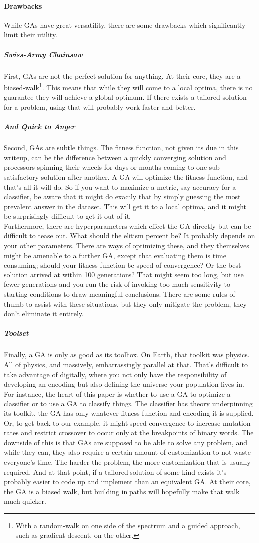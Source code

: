 \paragraph{Drawbacks}
While GAs have great versatility, there are some drawbacks which significantly limit their utility.
\subparagraph{Swiss-Army Chainsaw}
First, GAs are not the perfect solution for anything.  At their core, they are a biased-walk\footnote{With a random-walk on one side of the spectrum and a guided approach, such as gradient descent, on the other.}.  This means that while they will come to a local optima, there is no guarantee they will achieve a global optimum.  If there exists a tailored solution for a problem, using that will probably work faster and better.
\subparagraph{And Quick to Anger}
Second, GAs are subtle things.  The fitness function, not given its due in this writeup, can be the difference between a quickly converging solution and processors spinning their wheels for days or months coming to one sub-satisfactory solution after another.  A GA will optimize the fitness function, and that's all it will do.  So if you want to maximize a metric, say accuracy for a classifier, be aware that it might do exactly that by simply guessing the most prevalent answer in the dataset.  This will get it to a local optima, and it might be surprisingly difficult to get it out of it.\\
Furthermore, there are hyperparameters which effect the GA directly but can be difficult to tease out.  What should the elitism percent be?  It probably depends on your other parameters.  There are ways of optimizing these, and they themselves might be amenable to a further GA, except that evaluating them is time consuming; should your fitness function be speed of convergence?  Or the best solution arrived at within 100 generations?  That might seem too long, but use fewer generations and you run the risk of invoking too much sensitivity to starting conditions to draw meaningful conclusions.  There are some rules of thumb to assist with these situations, but they only mitigate the problem, they don't eliminate it entirely.
\subparagraph{Toolset}
Finally, a GA is only as good as its toolbox.  On Earth, that toolkit was physics.  All of physics, and massively, embarrassingly parallel at that.  That's difficult to take advantage of digitally, where you not only have the responsibility of developing an encoding but also defining the universe your population lives in.  For instance, the heart of this paper is whether to use a GA to optimize a classifier or to use a GA to classify things.  The classifier has theory underpinning its toolkit, the GA has only whatever fitness function and encoding it is supplied.  Or, to get back to our example, it might speed convergence to increase mutation rates and restrict crossover to occur only at the breakpoints of binary words.  The downside of this is that GAs are supposed to be able to solve any problem, and while they can, they also require a certain amount of customization to not waste everyone's time.  The harder the problem, the more customization that is usually required.  And at that point, if a tailored solution of some kind exists it's probably easier to code up and implement than an equivalent GA.  At their core, the GA is a biased walk, but building in paths will hopefully make that walk much quicker.
